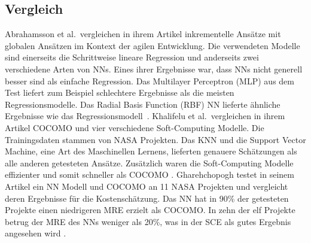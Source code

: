 \subsection{Vergleich}
Abrahamsson et al.~vergleichen in ihrem Artikel inkrementelle Ansätze mit globalen Ansätzen im Kontext der agilen Entwicklung. Die verwendeten Modelle sind einerseits die Schrittweise lineare Regression und anderseits zwei verschiedene Arten von NNs. Eines ihrer Ergebnisse war, dass NNs nicht generell besser sind als einfache Regression. Das Multilayer Perceptron (MLP) aus dem Test liefert zum Beispiel schlechtere Ergebnisse als die meisten Regressionsmodelle. Das Radial Basis Function (RBF) NN lieferte ähnliche Ergebnisse wie das Regressionsmodell~\cite{Abrahamsson2007}.
Khalifelu et al.~vergleichen in ihrem Artikel COCOMO und vier verschiedene Soft-Computing Modelle. Die Trainingsdaten stammen von NASA Projekten. Das KNN und die Support Vector Machine, eine Art des Maschinellen Lernens, lieferten genauere Schätzungen als alle anderen getesteten Ansätze. Zusätzlich waren die Soft-Computing Modelle effizienter und somit schneller als COCOMO \cite{Khalifelu2012}.
Gharehchopogh testet in seinem Artikel ein NN Modell und COCOMO an 11 NASA Projekten und vergleicht deren Ergebnisse für die Kostenschätzung. Das NN hat in 90\% der getesteten Projekte einen niedrigeren MRE erzielt als COCOMO. In zehn der elf Projekte betrug der MRE des NNs weniger als 20\%, was in der SCE als gutes Ergebnis angesehen wird \cite{Gharehchopogh2011}\cite{Abrahamsson2007}.